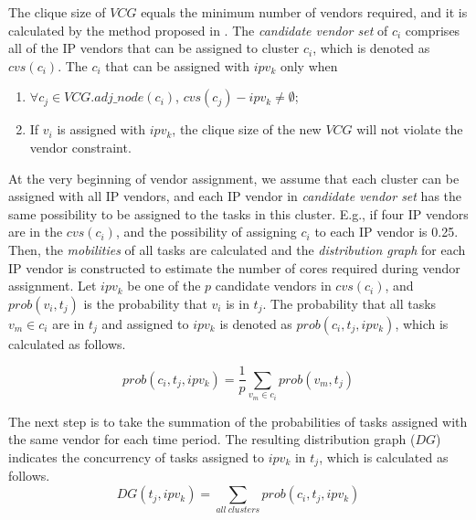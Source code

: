 \documentclass[conference]{IEEEtran}
\begin{document}
The clique size of $VCG$ equals the minimum number of vendors required, and it is calculated by the method proposed in \cite{article:NW}. The \textit{candidate vendor set} of $c_i$ comprises all of the IP vendors that can be assigned to cluster $c_i$, which is denoted as $cvs(c_i)$. The $c_i$ that can be assigned with $ipv_k$ only when

\begin{enumerate}
\item $\forall c_j \in VCG.adj\_node(c_i)$, $cvs(c_j)-ipv_k \neq \emptyset$;
\item If $v_i$ is assigned with $ipv_k$, the clique size of the new $VCG$ will not violate the vendor constraint.
\end{enumerate}


At the very beginning of vendor assignment, we assume that each cluster can be assigned with all IP vendors, and each IP vendor in \textit{candidate vendor set} has the same possibility to be assigned to the tasks in this cluster. E.g., if four IP vendors are in the $cvs(c_i)$, and the possibility of assigning $c_i$ to each IP vendor is 0.25. Then, the \textit{mobilities} of all tasks are calculated and the \textit{distribution graph} \cite{article:PP} for each IP vendor is constructed to estimate the number of cores required during vendor assignment. Let $ipv_k$ be one of the $p$ candidate vendors in $cvs(c_i)$, and $prob(v_i,t_j)$ is the probability that $v_i$ is in $t_j$. The probability that all tasks $v_m\in c_i$ are in $t_j$ and assigned to $ipv_k$ is denoted as $prob(c_i, t_j, ipv_k)$, which is calculated as follows.

\begin{equation}
prob(c_i, t_j, ipv_k)=\frac{1}{p}\sum \limits_{v_m\in c_i}prob(v_m,t_j)
\end{equation}

The next step is to take the summation of the probabilities of tasks assigned with the same vendor for each time period. The resulting distribution graph ($DG$) indicates the concurrency of tasks assigned to $ipv_k$ in $t_j$, which is calculated as follows.
\begin{equation}
DG(t_j, ipv_k) = \sum \limits_{all~clusters} prob(c_i, t_j, ipv_k)
\end{equation}
\end{document}

